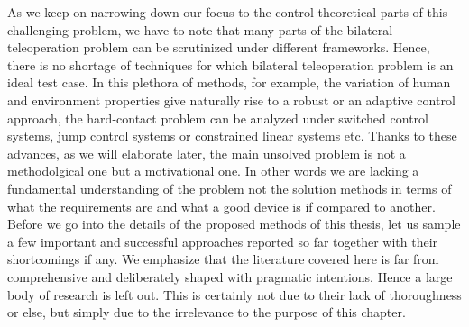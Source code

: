 As we keep on narrowing down our focus to the control theoretical parts of this challenging problem, we have to 
note that many parts of the bilateral teleoperation problem can be scrutinized under different frameworks. 
Hence, there is no shortage of techniques for which bilateral teleoperation problem is an ideal 
test case. In this plethora of methods, for example, the variation of human and environment properties give 
naturally rise to a robust or an adaptive control approach, the hard-contact problem can be analyzed under 
switched control systems, jump control systems or constrained linear systems etc. Thanks to these advances, 
as we will elaborate later, the main unsolved problem is not a methodolgical one but a motivational one. In
other words we are lacking a fundamental understanding of the problem not the solution methods in terms of 
what the requirements are and what a good device is if compared to another. Before we go into the 
details of the proposed methods of this thesis, let us sample a few important and successful approaches 
reported so far together with their shortcomings if any. We emphasize that the literature covered here is 
far from comprehensive and deliberately shaped with pragmatic intentions. Hence a large body of research is 
left out. This is certainly not due to their lack of thoroughness or else, but simply due to the irrelevance 
to the purpose of this chapter.


